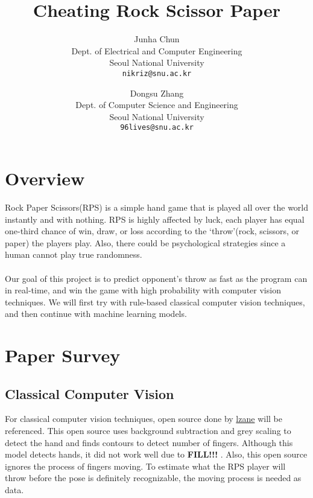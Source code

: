 \documentclass[10pt,twocolumn,letterpaper]{article}
\begin{document}
\title{Cheating Rock Scissor Paper}

\author{Junha Chun\\
Dept. of Electrical and Computer Engineering\\
Seoul National University \\
{\tt\small nikriz@snu.ac.kr}
\and
Dongsu Zhang\\
Dept. of Computer Science and Engineering\\
Seoul National University\\
{\tt\small 96lives@snu.ac.kr}
}

\maketitle
\section{Overview}
Rock Paper Scissors(RPS) is a simple hand game that is played all over the world instantly and with nothing. RPS is highly affected by luck, each player has equal one-third chance of win, draw, or loss according to the ‘throw’(rock, scissors, or paper) the players play. Also, there could be psychological strategies since a human cannot play true randomness. 
\paragraph{}
Our goal of this project is to predict opponent’s throw as fast as the program can in real-time, and win the game with high probability with computer vision techniques. We will first try with rule-based classical computer vision techniques, and then continue with machine learning models.


\section{Paper Survey}

\subsection{Classical Computer Vision}
For classical computer vision techniques, open source done by \href{https://github.com/lzane/Fingers-Detection-using-OpenCV-and-Python}{lzane} will be referenced. This open source uses background subtraction and grey scaling to detect the hand and finds contours to detect number of fingers.
Although this model detects hands, it did not work well  due to \textbf{FILL!!!} . Also, this open source ignores the process of fingers moving. To estimate what the RPS player will throw before the pose is definitely recognizable, the moving process is needed as data.
\end{document}
